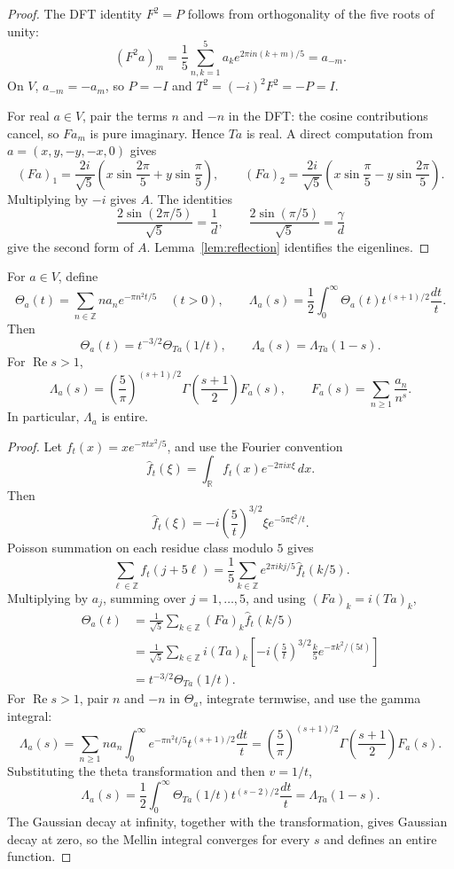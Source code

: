 \begin{proof}
The DFT identity \(F^2=P\) follows from orthogonality of the five roots of unity:
\[
(F^2a)_m=\frac15\sum_{n,k=1}^5a_ke^{2\pi in(k+m)/5}=a_{-m}.
\]
On \(V\), \(a_{-m}=-a_m\), so \(P=-I\) and \(T^2=(-i)^2F^2=-P=I\).

For real \(a\in V\), pair the terms \(n\) and \(-n\) in the DFT: the cosine contributions cancel, so \(Fa_m\) is pure imaginary. Hence \(Ta\) is real. A direct computation from \(a=(x,y,-y,-x,0)\) gives
\[
(Fa)_1=\frac{2i}{\sqrt5}\left(x\sin\frac{2\pi}{5}+y\sin\frac{\pi}{5}\right),
\qquad
(Fa)_2=\frac{2i}{\sqrt5}\left(x\sin\frac{\pi}{5}-y\sin\frac{2\pi}{5}\right).
\]
Multiplying by \(-i\) gives \(A\). The identities
\[
\frac{2\sin(2\pi/5)}{\sqrt5}=\frac1d,
\qquad
\frac{2\sin(\pi/5)}{\sqrt5}=\frac{\gamma}{d}
\]
give the second form of \(A\). Lemma~\ref{lem:reflection} identifies the eigenlines.
\end{proof}

\begin{lemma}\label{lem:theta}
For \(a\in V\), define
\[
\Theta_a(t)=\sum_{n\in\mathbb Z}n a_n e^{-\pi n^2t/5}\quad(t>0),
\qquad
\Lambda_a(s)=\frac12\int_0^\infty\Theta_a(t)t^{(s+1)/2}\frac{dt}{t}.
\]
Then
\[
\Theta_a(t)=t^{-3/2}\Theta_{Ta}(1/t),
\qquad
\Lambda_a(s)=\Lambda_{Ta}(1-s).
\]
For \(\operatorname{Re}s>1\),
\[
\Lambda_a(s)=\left(\frac5\pi\right)^{(s+1)/2}
\Gamma\!\left(\frac{s+1}{2}\right)F_a(s),
\qquad
F_a(s)=\sum_{n\ge1}\frac{a_n}{n^s}.
\]
In particular, \(\Lambda_a\) is entire.
\end{lemma}

\begin{proof}
Let \(f_t(x)=xe^{-\pi tx^2/5}\), and use the Fourier convention
\[
\widehat f_t(\xi)=\int_{\mathbb R}f_t(x)e^{-2\pi ix\xi}\,dx.
\]
Then
\[
\widehat f_t(\xi)
=-i\left(\frac5t\right)^{3/2}\xi e^{-5\pi\xi^2/t}.
\]
Poisson summation on each residue class modulo \(5\) gives
\[
\sum_{\ell\in\mathbb Z}f_t(j+5\ell)
=\frac15\sum_{k\in\mathbb Z}e^{2\pi ikj/5}\widehat f_t(k/5).
\]
Multiplying by \(a_j\), summing over \(j=1,\dots,5\), and using \((Fa)_k=i(Ta)_k\),
\[
\begin{aligned}
\Theta_a(t)
&=\frac1{\sqrt5}\sum_{k\in\mathbb Z}(Fa)_k\widehat f_t(k/5)\\
&=\frac1{\sqrt5}\sum_{k\in\mathbb Z}i(Ta)_k
\left[-i\left(\frac5t\right)^{3/2}\frac{k}{5}e^{-\pi k^2/(5t)}\right]\\
&=t^{-3/2}\Theta_{Ta}(1/t).
\end{aligned}
\]
For \(\operatorname{Re}s>1\), pair \(n\) and \(-n\) in \(\Theta_a\), integrate termwise, and use the gamma integral:
\[
\Lambda_a(s)
=\sum_{n\ge1}n a_n\int_0^\infty e^{-\pi n^2t/5}t^{(s+1)/2}\frac{dt}{t}
=\left(\frac5\pi\right)^{(s+1)/2}\Gamma\!\left(\frac{s+1}{2}\right)F_a(s).
\]
Substituting the theta transformation and then \(v=1/t\),
\[
\Lambda_a(s)
=\frac12\int_0^\infty\Theta_{Ta}(1/t)t^{(s-2)/2}\frac{dt}{t}
=\Lambda_{Ta}(1-s).
\]
The Gaussian decay at infinity, together with the transformation, gives Gaussian decay at zero, so the Mellin integral converges for every \(s\) and defines an entire function.
\end{proof}

